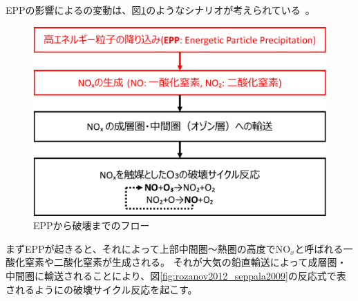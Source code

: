 EPPの影響によるの変動は、図\ref{fig:epp_to_ozone_flow}のようなシナリオが考えられている~\cite{rozanov2012influence}。
\begin{figure}[htbp]
    \centering
    \includegraphics[width=\linewidth]{master_thesis_contents/master_thesis_fig/epp_to_ozone_flow.pdf}
    \caption{EPPから破壊までのフロー}
    \label{fig:epp_to_ozone_flow}
\end{figure}
まずEPPが起きると、それによって上部中間圏〜熱圏の高度で$\mathrm{NO}_x$と呼ばれる一酸化窒素や二酸化窒素が生成される。
それが大気の鉛直輸送によって成層圏・中間圏に輸送されることにより、図\ref{fig:rozanov2012_seppala2009}の反応式で表されるようにの破壊サイクル反応を起こす。


